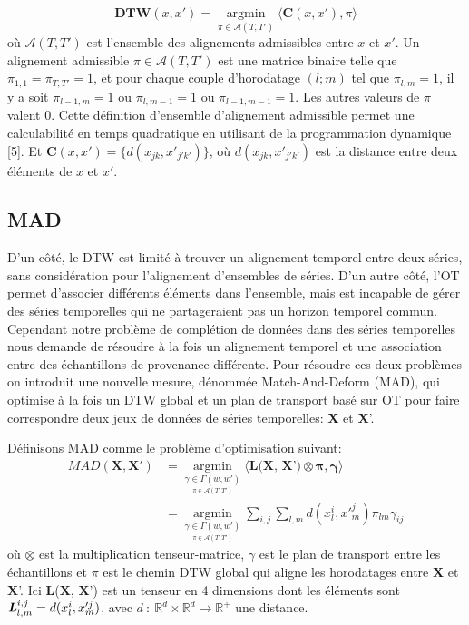 \documentclass[acmsmall, natbib=false, nonacm]{acmart}
\begin{document}
$$\textbf{DTW}(x,x') = \underset{\pi \in \mathcal{A}(T, T')}{\operatorname{\arg \min}} \langle \textbf{C}(x, x'), \pi \rangle$$
où $\mathcal{A}(T, T')$ est l'ensemble des alignements admissibles entre $x$ et $x'$. 
Un alignement admissible $\pi \in \mathcal{A}(T, T')$ est une matrice binaire telle que $\pi_{1,1} = \pi_{T, T'} = 1$,
et pour chaque couple d'horodatage $(l;m)$ tel que $\pi_{l, m} = 1$, il y a soit
$\pi_{l-1, m} = 1$ ou $\pi_{l, m-1} = 1$ ou $\pi_{l-1, m-1} = 1$.
Les autres valeurs de $\pi$ valent 0. Cette définition d'ensemble d'alignement admissible permet une calculabilité en temps quadratique en utilisant de la programmation dynamique [5].
Et $\textbf{C}(x, x') = \{d(x_{jk}, x'_{j'k'})\}$, où $d(x_{jk}, x'_{j'k'})$ est la distance entre deux éléments de $x$ et $x'$.

\subsection{MAD}
D'un côté, le DTW est limité à trouver un alignement temporel entre deux séries, 
sans considération pour l'alignement d'ensembles de séries.
D'un autre côté, l'OT permet d'associer différents éléments dans l'ensemble, mais est incapable de gérer des séries temporelles qui ne partageraient pas un horizon temporel commun.
Cependant notre problème de complétion de données dans des séries temporelles nous demande de résoudre à la fois un alignement temporel et une association entre des échantillons de provenance différente.
Pour résoudre ces deux problèmes on introduit une nouvelle mesure, dénommée Match-And-Deform (MAD), qui optimise à la fois un DTW global et un plan de transport basé sur OT pour faire correspondre deux jeux de données de séries temporelles:
\textbf{X} et \textbf{X}'.

Définisons MAD comme le problème d'optimisation suivant:
\begin{equation*}
\begin{split}
    MAD(\textbf{X}, \textbf{X}') & = \underset{\underset{\pi \in \mathcal{A}(T, T')}{\gamma \in \Gamma(w, w')}}{\operatorname{\arg \min}} \langle \textbf{L(X, X')} \otimes \mathbf{\pi, \gamma} \rangle \\
    & = \underset{\underset{\pi \in \mathcal{A}(T, T')}{\gamma \in \Gamma(w, w')}}{\operatorname{\arg \min}} \sum_{i,j} \sum_{l,m} d(x^i_l, x'^j_m) \pi_{lm} \gamma_{ij}
\end{split}
\end{equation*}
où $\otimes$ est la multiplication tenseur-matrice, $\gamma$ est le plan de transport entre les échantillons et $\pi$ est le chemin DTW global 
qui aligne les horodatages entre \textbf{X} et \textbf{X}'.
Ici \textbf{L}(\textbf{X}, \textbf{X}') est un tenseur en 4 dimensions dont les éléments sont $\textbf{\textit{L}}^{i,j}_{l,m} = d(x^i_l, x'^j_m)$, 
avec $d\: :\: \mathds{R}^d \times \mathds{R}^d \rightarrow \mathds{R}^+$ une distance.
\end{document}
